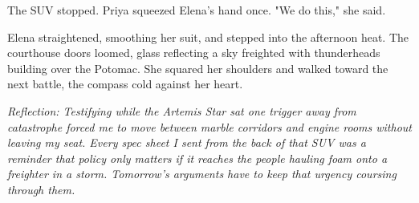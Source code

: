 The SUV stopped. Priya squeezed Elena's hand once. "We do this," she said.

Elena straightened, smoothing her suit, and stepped into the afternoon heat. The courthouse doors loomed, glass reflecting a sky freighted with thunderheads building over the Potomac. She squared her shoulders and walked toward the next battle, the compass cold against her heart.

\noindent\textit{Reflection: Testifying while the \textit{Artemis Star} sat one trigger away from catastrophe forced me to move between marble corridors and engine rooms without leaving my seat. Every spec sheet I sent from the back of that SUV was a reminder that policy only matters if it reaches the people hauling foam onto a freighter in a storm. Tomorrow's arguments have to keep that urgency coursing through them.}
